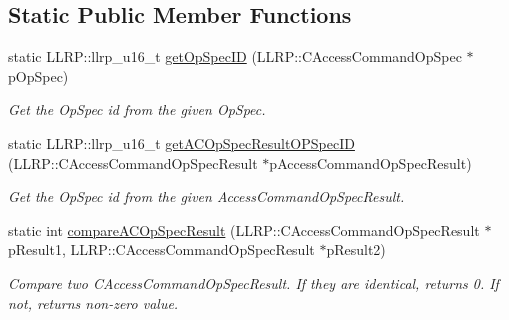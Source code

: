 \subsection*{Static Public Member Functions}
\begin{DoxyCompactItemize}
\item 
static L\-L\-R\-P\-::llrp\-\_\-u16\-\_\-t \hyperlink{class_e_l_f_i_n_1_1_access_operation_a153d7378aa347f667b22a2a170837622}{get\-Op\-Spec\-I\-D} (L\-L\-R\-P\-::\-C\-Access\-Command\-Op\-Spec $\ast$p\-Op\-Spec)
\begin{DoxyCompactList}\small\item\em Get the Op\-Spec id from the given Op\-Spec. \end{DoxyCompactList}\item 
static L\-L\-R\-P\-::llrp\-\_\-u16\-\_\-t \hyperlink{class_e_l_f_i_n_1_1_access_operation_a779c7cc8692989b0b1bc5789cef29e5b}{get\-A\-C\-Op\-Spec\-Result\-O\-P\-Spec\-I\-D} (L\-L\-R\-P\-::\-C\-Access\-Command\-Op\-Spec\-Result $\ast$p\-Access\-Command\-Op\-Spec\-Result)
\begin{DoxyCompactList}\small\item\em Get the Op\-Spec id from the given Access\-Command\-Op\-Spec\-Result. \end{DoxyCompactList}\item 
static int \hyperlink{class_e_l_f_i_n_1_1_access_operation_a7f5fbbbd2e32941d87c0f296d9869dd4}{compare\-A\-C\-Op\-Spec\-Result} (L\-L\-R\-P\-::\-C\-Access\-Command\-Op\-Spec\-Result $\ast$p\-Result1, L\-L\-R\-P\-::\-C\-Access\-Command\-Op\-Spec\-Result $\ast$p\-Result2)
\begin{DoxyCompactList}\small\item\em Compare two C\-Access\-Command\-Op\-Spec\-Result. If they are identical, returns 0. If not, returns non-\/zero value. \end{DoxyCompactList}\end{DoxyCompactItemize}
